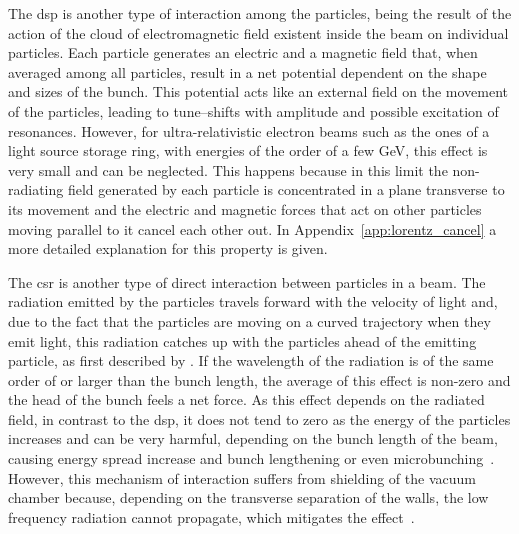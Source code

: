     The \gls{dsp} is another type of interaction among the particles, being the result of the action of the cloud of electromagnetic field existent inside the beam on individual particles. Each particle generates an electric and a magnetic field that, when averaged among all particles, result in a net potential dependent on the shape and sizes of the bunch. This potential acts like an external field on the movement of the particles, leading to tune--shifts with amplitude and possible excitation of resonances. However, for ultra-relativistic electron beams such as the ones of a light source storage ring, with energies of the order of a few \si{\giga\electronvolt}, this effect is very small and can be neglected. This happens because in this limit the non-radiating field generated by each particle is concentrated in a plane transverse to its movement and the electric and magnetic forces that act on other particles moving parallel to it cancel each other out. In Appendix~\ref{app:lorentz_cancel} a more detailed explanation for this property is given.

    The \gls{csr} is another type of direct interaction between particles in a beam. The radiation emitted by the particles travels forward with the velocity of light and, due to the fact that the particles are moving on a curved trajectory when they emit light, this radiation catches up with the particles ahead of the emitting particle, as first described by . If the wavelength of the radiation is of the same order of or larger than the bunch length, the average of this effect is non-zero and the head of the bunch feels a net force. As this effect depends on the radiated field, in contrast to the \gls{dsp}, it does not tend to zero as the energy of the particles increases and can be very harmful, depending on the bunch length of the beam, causing energy spread increase and bunch lengthening or even microbunching~\cite{Byrd2002}. However, this mechanism of interaction suffers from shielding of the vacuum chamber because, depending on the transverse separation of the walls, the low frequency radiation cannot propagate, which mitigates the effect~\cite{Murphy1997}.

